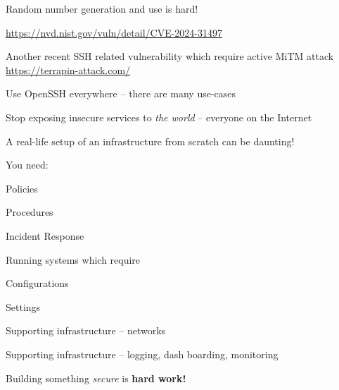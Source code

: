 \documentclass[Screen16to9,17pt]{foils}
\begin{document}
\begin{list1}
\item Random number generation and use is hard!
\item \url{https://nvd.nist.gov/vuln/detail/CVE-2024-31497}
\item Another recent SSH related vulnerability which require active MiTM attack \url{https://terrapin-attack.com/}
\end{list1}




\begin{list1}
\item Use OpenSSH everywhere -- there are many use-cases
\item Stop exposing insecure services to \emph{the world} -- everyone on the Internet

\end{list1}



\begin{list1}
\item A real-life setup of an infrastructure from scratch can be daunting!
\item You need:
\begin{list2}
\item Policies
\item Procedures
\item Incident Response
\end{list2}
\item Running systems which require
\begin{list2}
\item Configurations
\item Settings
\item Supporting infrastructure -- networks
\item Supporting infrastructure -- logging, dash boarding, monitoring
\end{list2}
\item Building something \emph{secure} is {\bf hard work!}
\end{list1}




\end{document}
